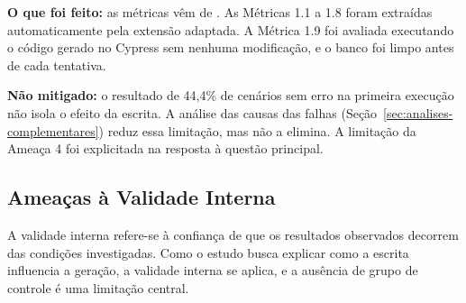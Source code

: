 \textbf{O que foi feito:} as métricas vêm de . As Métricas 1.1 a 1.8 foram extraídas automaticamente pela extensão adaptada. A Métrica 1.9 foi avaliada executando o código gerado no Cypress sem nenhuma modificação, e o banco foi limpo antes de cada tentativa.

\textbf{Não mitigado:} o resultado de 44,4\% de cenários sem erro na primeira execução não isola o efeito da escrita. A análise das causas das falhas (Seção~\ref{sec:analises-complementares}) reduz essa limitação, mas não a elimina. A limitação da Ameaça 4 foi explicitada na resposta à questão principal.

\subsection{Ameaças à Validade Interna}

A validade interna refere-se à confiança de que os resultados observados decorrem das condições investigadas. Como o estudo busca explicar como a escrita influencia a geração, a validade interna se aplica, e a ausência de grupo de controle é uma limitação central.

